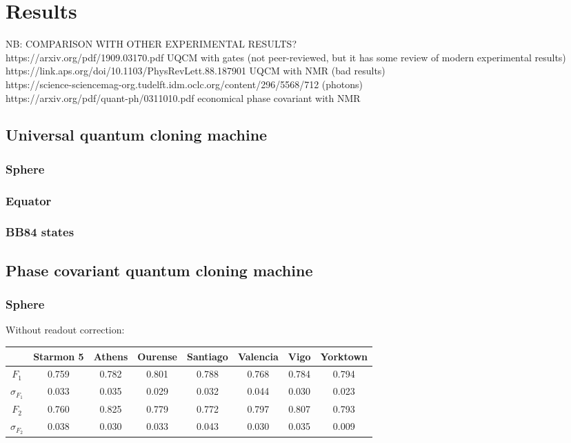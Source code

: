 \chapter{Results}
\label{sec:results}
NB: COMPARISON WITH OTHER EXPERIMENTAL RESULTS?\\
https://arxiv.org/pdf/1909.03170.pdf UQCM with gates (not peer-reviewed, but it has some review of modern experimental results)\\
https://link.aps.org/doi/10.1103/PhysRevLett.88.187901 UQCM with NMR (bad results)\\
https://science-sciencemag-org.tudelft.idm.oclc.org/content/296/5568/712 (photons)\\
https://arxiv.org/pdf/quant-ph/0311010.pdf economical phase covariant with NMR\\

\section{Universal quantum cloning machine}
\subsection{Sphere}
\subsection{Equator}
\subsection{BB84 states}
\section{Phase covariant quantum cloning machine}
\subsection{Sphere}

Without readout correction:
\begin{table}[H]
    \centering
    \begin{tabular}{|c|c|c|c|c|c|c|c|}
    \hline
    \textbf{} & \textbf{Starmon 5} & \textbf{Athens} & \textbf{Ourense} & \textbf{Santiago} & \textbf{Valencia} & \textbf{Vigo} & \textbf{Yorktown} \\ \hline
    $F_1$              & 0.759 & 0.782 & 0.801 & 0.788 & 0.768 & 0.784 & 0.794 \\ \hline
    $\sigma_{F_1}$     & 0.033 & 0.035 & 0.029 & 0.032 & 0.044 & 0.030 & 0.023 \\ \hline
    $F_2$              & 0.760 & 0.825 & 0.779 & 0.772 & 0.797 & 0.807 & 0.793 \\ \hline
    $\sigma_{F_2}$     & 0.038 & 0.030 & 0.033 & 0.043 & 0.030 & 0.035 & 0.009 \\ \hline
    \end{tabular}
\end{table}

